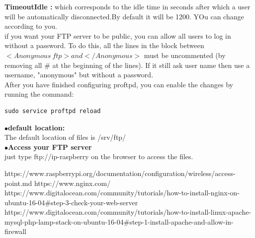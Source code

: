 \documentclass[journal,12pt,onecolumn]{IEEEtran}
\begin{document}
\begin{flushleft}
\begin{enumerate}
\bigskip
\textbf{TimeoutIdle :} which corresponds to the idle time in seconds after which a user will be automatically disconnected.By default it will be 1200. YOu can change according to you.\\
\medskip
if you want your FTP server to be public, you can allow all users to log in without a password. To do this, all the lines in the block between $<Anonymous ~ ftp> and </ Anonymous>$ must be uncommented (by removing all \# at the beginning of the lines). If it still ask user name then  use a username, "anonymous" but without a password.\\
\medskip
After you have finished configuring proftpd, you can enable the changes by running the command: \\
\begin{lstlisting}[frame=single,linewidth=9cm,breaklines=true]
sudo service proftpd reload
\end{lstlisting}
\bigskip
$\bullet${\textbf{default location:} } \\
The default location of files is /srv/ftp/  \\
\bigskip
$\bullet${\textbf{Access your FTP server}}  \\
just type ftp://ip-raspberry on the browser to access the files.
\end{enumerate}
\end{flushleft}
\begin{thebibliography}{9}
https://www.raspberrypi.org/documentation/configuration/wireless/access-point.md
https://www.nginx.com/
https://www.digitalocean.com/community/tutorials/how-to-install-nginx-on-ubuntu-16-04\#step-3-check-your-web-server
https://www.digitalocean.com/community/tutorials/how-to-install-linux-apache-mysql-php-lamp-stack-on-ubuntu-16-04\#step-1-install-apache-and-allow-in-firewall
\end{thebibliography}
\end{document}
